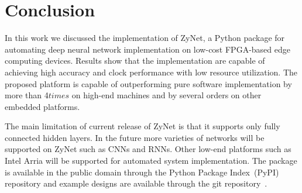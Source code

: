 \section{Conclusion}
\label{sec:conclusion}
In this work we discussed the implementation of ZyNet, a Python package for automating deep neural network implementation on low-cost FPGA-based edge computing devices.
Results show that the implementation are capable of achieving high accuracy and clock performance with low resource utilization.
The proposed platform is capable of outperforming pure software implementation by more than 4$times$ on high-end machines and by several orders on other embedded platforms.

The main limitation of current release of ZyNet is that it supports only fully connected hidden layers.
In the future more varieties of networks will be supported on ZyNet such as CNNs and RNNs.
Other low-end platforms such as Intel Arria will be supported for automated system implementation.
The package is available in the public domain through the Python Package Index~(PyPI) repository and example designs are available through the git repository~\cite{zynetgit}. 